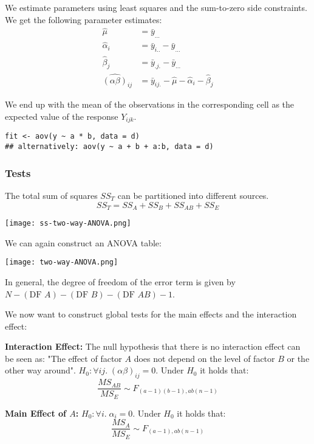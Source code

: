 We estimate parameters using least squares and the sum-to-zero side constraints. We get the following parameter estimates:
\begin{align*}
	\hat \mu &= \bar y_{...} \\
	\hat \alpha_i &= \bar y_{i..} - \bar y_{...} \\
	\hat \beta_j &= \bar y_{.j.} - \bar y_{...} \\
	\widehat {(\alpha \beta)}_{ij} &= \bar y_{ij.} - \hat \mu - \hat \alpha_i - \hat \beta_j
\end{align*}

We end up with the mean of the observations in the corresponding cell as the expected value of the response $Y_{ijk}$.

\begin{lstlisting}
fit <- aov(y ~ a * b, data = d) 
## alternatively: aov(y ~ a + b + a:b, data = d)
\end{lstlisting}

\subsubsection{Tests}

The total sum of squares $SS_T$ can be partitioned into different sources.
$$SS_T = SS_A + SS_B + SS_{AB} + SS_E$$

\begin{center}
	\texttt{[image: ss-two-way-ANOVA.png]}
\end{center}

We can again construct an ANOVA table:
\begin{center}
	\texttt{[image: two-way-ANOVA.png]}
\end{center}
In general, the degree of freedom of the error term is given by $N - (\text{DF } A) - (\text{DF } B) - (\text{DF } AB) - 1$. \medskip

We now want to construct global tests for the main effects and the interaction effect: \medskip

\textbf{Interaction Effect:} The null hypothesis that there is no interaction effect can be seen as: "The effect of factor $A$ does not depend on the level of factor $B$ or the other way around". $H_0: \forall ij. \; (\alpha \beta)_{ij} = 0$. Under $H_0$ it holds that:
$$\frac{MS_{AB}}{MS_E} \sim F_{(a-1)(b-1),ab(n-1)}$$

\textbf{Main Effect of $A$:} $H_0: \forall i. \; \alpha_i = 0$. Under $H_0$ it holds that:
$$\frac{MS_{A}}{MS_E} \sim F_{(a-1), ab(n-1)}$$
 
